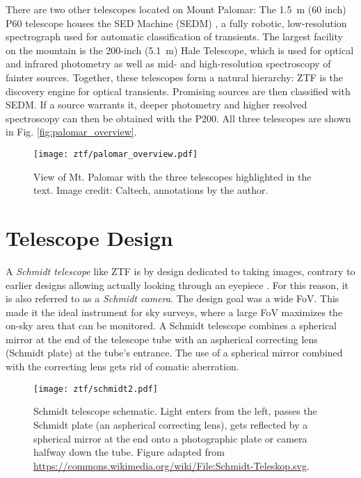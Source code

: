 There are two other telescopes located on Mount Palomar: The \SI{1.5}{\meter} (60 inch) P60 telescope houses the SED Machine (SEDM) , a fully robotic, low-resolution spectrograph used for automatic classification of transients. The largest facility on the mountain is the 200-inch (\SI{5.1}{\meter}) Hale Telescope, which is used for optical and infrared photometry as well as mid- and high-resolution spectroscopy of fainter sources. Together, these telescopes form a natural hierarchy: ZTF is the discovery engine for optical transients. Promising sources are then classified with SEDM. If a source warrants it, deeper photometry and higher resolved spectroscopy can then be obtained with the P200. All three telescopes are shown in Fig. \ref{fig:palomar_overview}.

\begin{figure*}[]
    \texttt{[image: ztf/palomar\_overview.pdf]}
    \caption[View of Mt. Palomar]{View of Mt. Palomar with the three telescopes highlighted in the text. Image credit: Caltech, annotations by the author.}
\end{figure*}

\section{Telescope Design}
A \textit{Schmidt telescope} like ZTF is by design dedicated to taking images, contrary to earlier designs allowing actually looking through an eyepiece . For this reason, it is also referred to as a \textit{Schmidt camera}. The design goal was a wide FoV. This made it the ideal instrument for sky surveys, where a large FoV maximizes the on-sky area that can be monitored. A Schmidt telescope combines a spherical mirror at the end of the telescope tube with an aspherical correcting lens (Schmidt plate) at the tube's entrance. The use of a spherical mirror combined with the correcting lens gets rid of comatic aberration.

\begin{figure}[]
    \texttt{[image: ztf/schmidt2.pdf]}
    \caption[Schmidt telescope schematic]{Schmidt telescope schematic. Light enters from the left, passes the Schmidt plate (an aspherical correcting lens), gets reflected by a spherical mirror at the end onto a photographic plate or camera halfway down the tube. Figure adapted from \url{https://commons.wikimedia.org/wiki/File:Schmidt-Teleskop.svg}.}
\end{figure}

